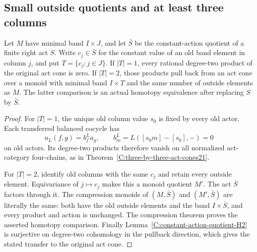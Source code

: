 \subsection{Small outside quotients and at least three columns}

\begin{lemma}
\label{C:old-column-image-two-transfer}
Let $M$ have minimal band $I\times J$, and let $\bar S$ be
the constant-action quotient of a finite right act $S$.
Write $c_j\in\bar S$ for the constant value of an old band
element in column $j$, and put $T=\{c_j:j\in J\}$.
If $|T|=1$, every rational degree-two product of the original
act cone is zero.  If $|T|=2$, those products pull back from
an act cone over a monoid with minimal band $I\times T$ and
the same number of outside elements as $M$.
The latter comparison is an actual homotopy equivalence
after replacing $S$ by $\bar S$.
\end{lemma}
\begin{proof}
For $|T|=1$, the unique old column value $s_0$ is fixed by
every old actor.  Each transferred balanced cocycle has
\[
 u_L(f,g)=b^L_fa_g,\qquad
 b^L_m=L([s_0m]-[s_0],-)=0
\]
on old actors.  Its degree-two products therefore vanish
on all normalized act-category four-chains, as in
Theorem~\ref{C:three-by-three-act-cones21}.

For $|T|=2$, identify old columns with the same $c_j$ and
retain every outside element.  Equivariance of $j\mapsto c_j$
makes this a monoid quotient $M'$.  The act $\bar S$ factors
through it.  The compression monoids of
$(M,\bar S)$ and $(M',\bar S)$ are literally the same: both
have the old outside elements and the band $I\times\bar S$,
and every product and action is unchanged.
The compression theorem proves the asserted homotopy
comparison.  Finally
Lemma~\ref{C:constant-action-quotient-H2} is surjective on
degree-two cohomology in the pullback direction, which gives
the stated transfer to the original act cone.
\end{proof}

